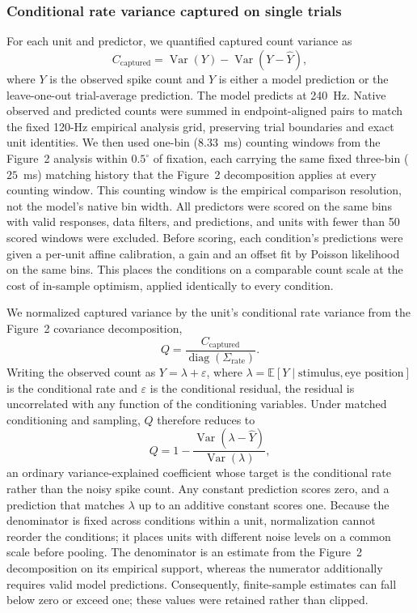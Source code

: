 \documentclass{lite}
\begin{document}
\subsubsection{Conditional rate variance captured on single trials}
For each unit and predictor, we quantified captured count variance as
\begin{equation}
C_{\mathrm{captured}}
=
\operatorname{Var}(Y)-\operatorname{Var}(Y-\hat{Y}),
\end{equation}
where $Y$ is the observed spike count and $\hat{Y}$ is either a model prediction or the leave-one-out trial-average prediction. The model predicts at 240~Hz. Native observed and predicted counts were summed in endpoint-aligned pairs to match the fixed 120-Hz empirical analysis grid, preserving trial boundaries and exact unit identities. We then used one-bin ($8.33$~ms) counting windows from the Figure~2 analysis within $0.5^\circ$ of fixation, each carrying the same fixed three-bin ($25$~ms) matching history that the Figure~2 decomposition applies at every counting window. This counting window is the empirical comparison resolution, not the model's native bin width. All predictors were scored on the same bins with valid responses, data filters, and predictions, and units with fewer than 50 scored windows were excluded. Before scoring, each condition's predictions were given a per-unit affine calibration, a gain and an offset fit by Poisson likelihood on the same bins. This places the conditions on a comparable count scale at the cost of in-sample optimism, applied identically to every condition.

We normalized captured variance by the unit's conditional rate variance from the Figure~2 covariance decomposition,
\begin{equation}
Q
=
\frac{C_{\mathrm{captured}}}
{\operatorname{diag}(\Sigma_{\mathrm{rate}})}.
\end{equation}
Writing the observed count as $Y = \lambda + \varepsilon$, where $\lambda = \mathbb{E}[Y \mid \text{stimulus}, \text{eye position}]$ is the conditional rate and $\varepsilon$ is the conditional residual, the residual is uncorrelated with any function of the conditioning variables. Under matched conditioning and sampling, $Q$ therefore reduces to
\begin{equation}
Q
=
1-\frac{\operatorname{Var}(\lambda-\hat{Y})}{\operatorname{Var}(\lambda)},
\end{equation}
an ordinary variance-explained coefficient whose target is the conditional rate rather than the noisy spike count. Any constant prediction scores zero, and a prediction that matches $\lambda$ up to an additive constant scores one. Because the denominator is fixed across conditions within a unit, normalization cannot reorder the conditions; it places units with different noise levels on a common scale before pooling. The denominator is an estimate from the Figure~2 decomposition on its empirical support, whereas the numerator additionally requires valid model predictions. Consequently, finite-sample estimates can fall below zero or exceed one; these values were retained rather than clipped.
\end{document}
